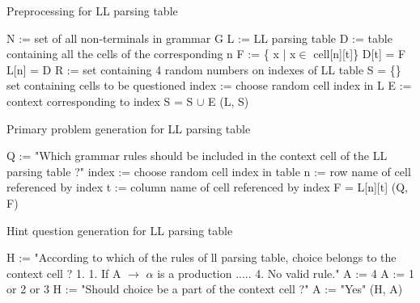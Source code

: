 \begin{algorithm}
\caption{Preprocessing for LL parsing table}
\label{algo:preprocessing-lltable}
\begin{algorithmic}[1]
\State N := set of all non-terminals in grammar G
\State L := LL parsing table 
\State D := table containing all the cells of the corresponding n
\State F := \{ x | x$\in$ cell[n][t]\}
\State D[t] = F
\EndFor
\State L[n] = D
\EndFor
\State R := set containing 4 random numbers on indexes of LL table
\State S = \{\} \Comment set containing cells to be questioned
\State index := choose random cell index in L
\State E := context corresponding to index
\State S = S $\cup$ E
\EndFor
\State \Return (L, S)
\EndFunction
\end{algorithmic}
\end{algorithm}

\begin{algorithm}
\caption{Primary problem generation for LL parsing table}
\label{algo:primary-lltable}
\begin{algorithmic}[1]
\State Q := "Which grammar rules should be included in the context cell of the LL parsing table ?"
\State index := choose random cell index in table
\State n := row name of cell referenced by index
\State t := column name of cell referenced by index
\State F = L[n][t]
\State \Return (Q, F)
\EndFunction
\end{algorithmic}
\end{algorithm}

\begin{algorithm}
\caption{Hint question generation for LL parsing table}
\label{algo:hint-lltable}
\begin{algorithmic}[1]
\State H := "According to which of the rules of ll parsing table, choice belongs to the context cell ? 1. 1. If A $\rightarrow$ $\alpha$ is a production ..... 4. No valid rule."
\State A := 4
\State A := 1 or 2 or 3
\EndIf
{}
\State H := "Should choice be a part of the context cell ?"
\State A := "Yes"
\EndIf
\State \Return (H, A)
\EndFunction
\end{algorithmic}
\end{algorithm}

